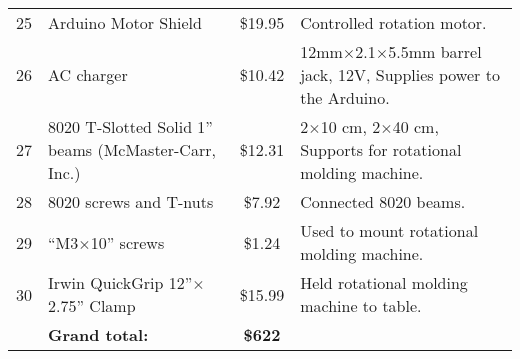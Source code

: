 \begin{table*}
\begin{scriptsize}
\begin{center}
\begin{tabular}{clcl}
 25 & Arduino Motor Shield  & \$19.95 & Controlled rotation motor. \\  %
 \rowcolor{gray!25}
 26 & AC charger & \$10.42 & 12mm$\times$2.1$\times$5.5mm barrel jack, 12V, Supplies power to the Arduino. \\ 
 27 & 8020 T-Slotted Solid 1'' beams (McMaster-Carr, Inc.) & \$12.31 & 2$\times$10 cm, 2$\times$40 cm, Supports for rotational molding machine. \\ 
 \rowcolor{gray!25}
 28 & 8020 screws and T-nuts & \$7.92 & Connected 8020 beams. \\ %
 29 & ``M3$\times$10'' screws & \$1.24 & Used to mount rotational molding machine. \\ 
 \rowcolor{gray!25}
 30 & Irwin QuickGrip 12''$\times$2.75'' Clamp & \$15.99 & Held rotational molding machine to table. \\
 \toprule
  & \textbf{Grand total:} & \textbf{\$622} &  \\
 \bottomrule
\end{tabular}
\end{center}
\end{scriptsize}
\vspace{-2.5em}
\end{table*}
